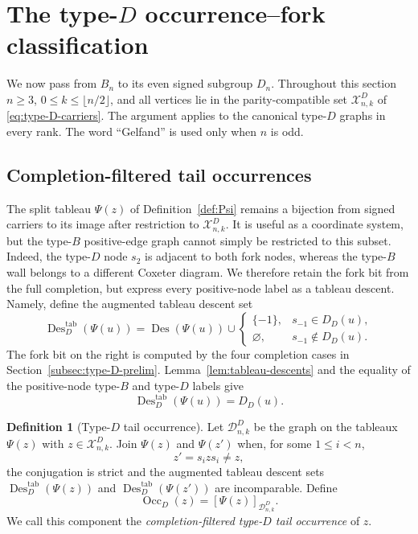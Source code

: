 \documentclass[11pt]{article}
\theoremstyle{definition}
\newtheorem{definition}[theorem]{Definition}
\theoremstyle{remark}
\newcommand{\Des}{\operatorname{Des}}
\newcommand{\Occ}{\operatorname{Occ}}
\newcommand{\cD}{\mathcal D}
\newcommand{\cX}{\mathcal X}
\begin{document}
\section{The type-\texorpdfstring{$D$}{D} occurrence--fork classification}
\label{sec:type-d}

We now pass from $B_n$ to its even signed subgroup $D_n$.  Throughout this
section $n\geq3$, $0\leq k\leq\lfloor n/2\rfloor$, and all vertices lie
in the parity-compatible set $\cX^D_{n,k}$ of
\eqref{eq:type-D-carriers}.  The argument applies to the canonical
type-$D$ graphs in every rank.  The word ``Gelfand'' is used only when
$n$ is odd.

\subsection{Completion-filtered tail occurrences}

The split tableau $\Psi(z)$ of Definition~\ref{def:Psi} remains a
bijection from signed carriers to its image after restriction to
$\cX^D_{n,k}$.  It is useful as a coordinate system, but the type-$B$
positive-edge graph cannot simply be restricted to this subset.  Indeed,
the type-$D$ node $s_2$ is adjacent to both fork nodes, whereas the
type-$B$ wall belongs to a different Coxeter diagram.  We therefore retain
the fork bit from the full completion, but express every positive-node
label as a tableau descent.  Namely, define the augmented tableau descent
set
\begin{equation}
 \Des_D^{\mathrm{tab}}(\Psi(u))
   =\Des(\Psi(u))\cup
   \begin{cases}
    \{-1\},&s_{-1}\in D_D(u),\\
    \varnothing,&s_{-1}\notin D_D(u).
   \end{cases}
 \label{eq:D-augmented-tableau-descents}
\end{equation}
The fork bit on the right is computed by the four completion cases in
Section~\ref{subsec:type-D-prelim}.  Lemma~\ref{lem:tableau-descents}
and the equality of the positive-node type-$B$ and type-$D$ labels give
\[
                    \Des_D^{\mathrm{tab}}(\Psi(u))=D_D(u).
\]

\begin{definition}[Type-$D$ tail occurrence]
\label{def:D-tail-occurrence}
Let $\cD^D_{n,k}$ be the graph on the tableaux $\Psi(z)$ with
$z\in\cX^D_{n,k}$.  Join $\Psi(z)$ and $\Psi(z')$ when, for some
$1\leq i<n$,
\[
 z'=s_i z s_i\ne z,
\]
the conjugation is strict and the augmented tableau descent sets
$\Des_D^{\mathrm{tab}}(\Psi(z))$ and
$\Des_D^{\mathrm{tab}}(\Psi(z'))$ are incomparable.  Define
\[
 \Occ_D(z)=[\Psi(z)]_{\cD^D_{n,k}}.
\]
We call this component the \emph{completion-filtered type-$D$ tail
occurrence} of $z$.
\end{definition}
\end{document}
